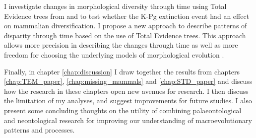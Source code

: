 I investigate changes in morphological diversity \citep[or disparity;][]{Wills1994} through time using Total Evidence trees from \cite{slaterphylogenetic2013} and \cite{beckancient2014} to test whether the K-Pg extinction event had an effect on mammalian diversification.
I propose a new approach to describe patterns of disparity through time based on the use of Total Evidence trees.
This approach allows more precision in describing the changes through time as well as more freedom for choosing the underlying models of morphological evolution \citep[e.g. punctuated or gradual;][]{Hunt21042015}.

Finally, in chapter \ref{chap:discussion} I draw together the results from chapters \ref{chap:TEM_paper}, \ref{chap:missing_mammals} and \ref{chap:STD_paper} and discuss how the research in these chapters open new avenues for research.
I then discuss the limitation of my analyses, and suggest improvements for future studies.
I also present some concluding thoughts on the utility of combining palaeontological and neontological research for improving our understanding of macroevolutionary patterns and processes.

%